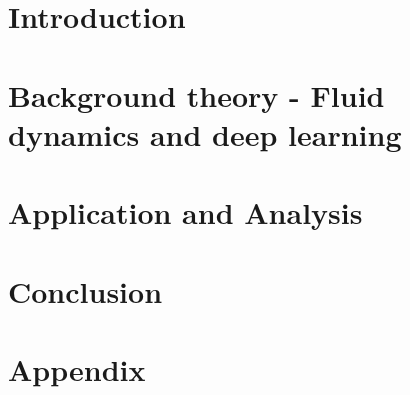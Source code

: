 
\addtolength{\evensidemargin}{-12mm}

%
%
\part[Introduction]{Introduction}
\label{part:Intro}


\part[Theory]{Background theory - Fluid dynamics and deep learning}
\label{part:Theory}


\part[Methodology]{Application and Analysis}
\label{part:Method}



% 
\part[Conclusion]{Conclusion}
\label{part:Conclusion}

%
%
\part*{Appendix}

\appendix %


